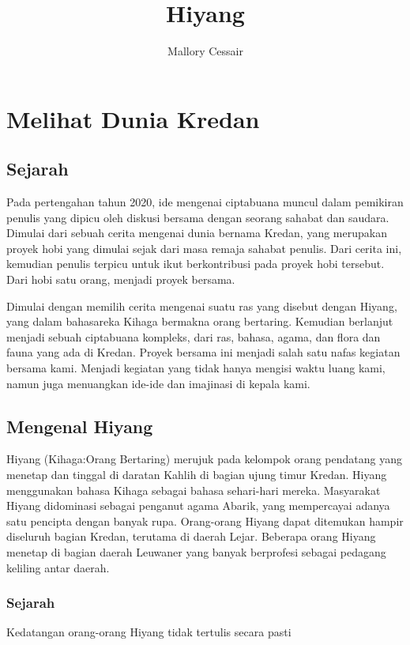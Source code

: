\documentclass[12pt]{report}
\title{Hiyang}
\author{Mallory Cessair}
\begin{document}
 
\maketitle

\chapter{Melihat Dunia Kredan}
\section{Sejarah}
Pada pertengahan tahun 2020, ide mengenai ciptabuana muncul dalam pemikiran penulis yang dipicu oleh diskusi bersama dengan seorang sahabat dan saudara. Dimulai dari sebuah cerita mengenai dunia bernama Kredan, yang merupakan proyek hobi yang dimulai sejak dari masa remaja sahabat penulis. Dari cerita ini, kemudian penulis terpicu untuk ikut berkontribusi pada proyek hobi tersebut. Dari hobi satu orang, menjadi proyek bersama. 

Dimulai dengan memilih cerita mengenai suatu ras yang disebut dengan Hiyang, yang dalam bahasareka Kihaga bermakna orang bertaring. Kemudian berlanjut menjadi sebuah ciptabuana kompleks, dari ras, bahasa, agama, dan flora dan fauna yang ada di Kredan. Proyek bersama ini menjadi salah satu nafas kegiatan bersama kami. Menjadi kegiatan yang tidak hanya mengisi waktu luang kami, namun juga menuangkan ide-ide dan imajinasi di kepala kami.

\section{Mengenal Hiyang}
Hiyang (Kihaga:Orang Bertaring) merujuk pada kelompok orang pendatang yang menetap dan tinggal di daratan Kahlih di bagian ujung timur Kredan. Hiyang menggunakan bahasa Kihaga sebagai bahasa sehari-hari mereka. Masyarakat Hiyang didominasi sebagai penganut agama Abarik, yang mempercayai adanya satu pencipta dengan banyak rupa. Orang-orang Hiyang dapat ditemukan hampir diseluruh bagian Kredan, terutama di daerah Lejar. Beberapa orang Hiyang menetap di bagian daerah Leuwaner yang banyak berprofesi sebagai pedagang keliling antar daerah.

\subsection{Sejarah}
Kedatangan orang-orang Hiyang tidak tertulis secara pasti
\end{document}
